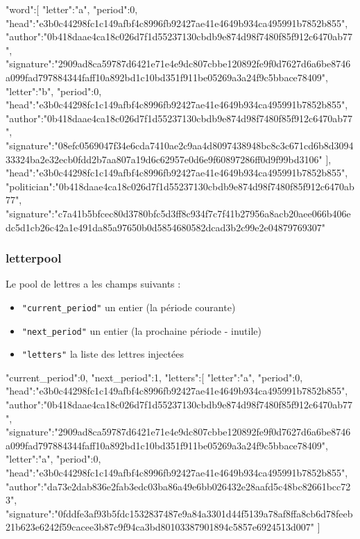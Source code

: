 \documentclass{article}
\begin{document}
\begin{jsonMessage}
   { "word":[ { "letter":"a", "period":0,
       "head":"e3b0c44298fc1c149afbf4c8996fb92427ae41e4649b934ca495991b7852b855",
       "author":"0b418daae4ca18c026d7f1d55237130cbdb9e874d98f7480f85f912c6470ab77",
       "signature":"2909ad8ca59787d6421e71e4e9dc807cbbe120892fe9f0d7627d6a6be8746a099fad797884344faff10a892bd1c10bd351f911be05269a3a24f9c5bbace78409"},
     { "letter":"b", "period":0,
       "head":"e3b0c44298fc1c149afbf4c8996fb92427ae41e4649b934ca495991b7852b855",
       "author":"0b418daae4ca18c026d7f1d55237130cbdb9e874d98f7480f85f912c6470ab77",
       "signature":"08efc0569047f34e6cda7410ae2c9aa4d8097438948bc8c3c671cd6b8d309433324ba2e32ecb0fdd2b7aa807a19d6c62957e0d6e9f60897286ff0d9f99bd3106"}
     ],
     "head":"e3b0c44298fc1c149afbf4c8996fb92427ae41e4649b934ca495991b7852b855",
     "politician":"0b418daae4ca18c026d7f1d55237130cbdb9e874d98f7480f85f912c6470ab77",
     "signature":"c7a41b5bfcec80d3780bfc5d3ff8c934f7c7f41b27956a8acb20aee066b406edc5d1cb26c42a1e491da85a97650b0d5854680582dcad3b2c99e2e04879769307"}
\end{jsonMessage}


 \subsubsection{letterpool}
 \label{sec:letterpool}

 Le pool de lettres a les champs suivants :
 \begin{itemize}
 \item \texttt{"current\_period"} un entier (la période courante)
 \item  \texttt{"next\_period"} un entier (la prochaine période -
   inutile)
 \item  \texttt{"letters"} la liste des lettres injectées
 \end{itemize}
\begin{jsonMessage}
   { "current_period":0, "next_period":1, "letters":[
     { "letter":"a", "period":0,
       "head":"e3b0c44298fc1c149afbf4c8996fb92427ae41e4649b934ca495991b7852b855",
       "author":"0b418daae4ca18c026d7f1d55237130cbdb9e874d98f7480f85f912c6470ab77",
       "signature":"2909ad8ca59787d6421e71e4e9dc807cbbe120892fe9f0d7627d6a6be8746a099fad797884344faff10a892bd1c10bd351f911be05269a3a24f9c5bbace78409"},
     { "letter":"a", "period":0,
       "head":"e3b0c44298fc1c149afbf4c8996fb92427ae41e4649b934ca495991b7852b855",
       "author":"da73e2dab836e2fab3edc03ba86a49e6bb026432e28aafd5c48bc82661bcc723",
       "signature":"0fddfe3af93b5fdc1532837487e9a84a3301d44f5139a78af8ffa8cb6d78feeb21b623e6242f59cacee3b87c9f94ca3bd80103387901894c5857e6924513d007"}
     ]  }
\end{jsonMessage}
\end{document}
